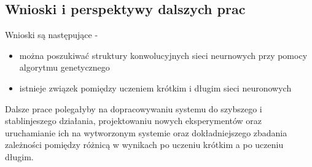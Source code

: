 \subsection{Wnioski i perspektywy dalszych prac}
Wnioski są następujące -
\begin{itemize}
  \item można poszukiwać struktury konwolucyjnych sieci neurnowych przy pomocy algorytmu genetycznego
  \item istnieje związek pomiędzy uczeniem krótkim i długim sieci neuronowych
\end{itemize}
Dalsze prace polegałyby na dopracowywaniu systemu do szybszego i stablinjeszego działania, projektowaniu nowych eksperymentów oraz uruchamianie ich na wytworzonym systemie oraz dokładniejszego zbadania zależności pomiędzy różnicą w wynikach po uczeniu krótkim a po uczeniu długim.
